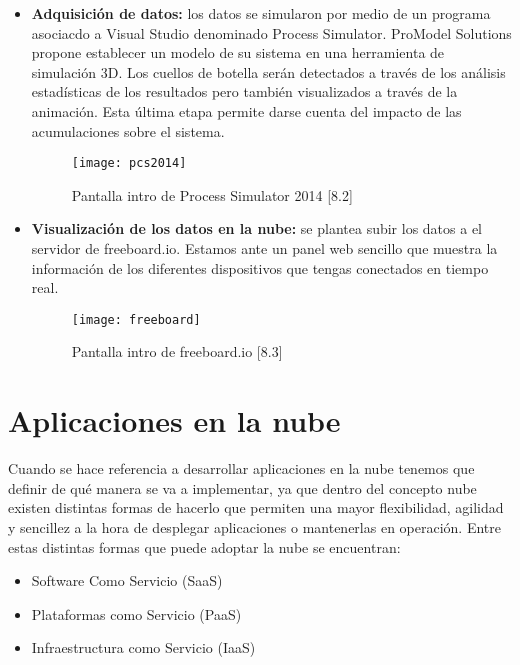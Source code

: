 \documentclass[10pt]{article}   			%
\begin{document}
\begin{itemize}
	\item \textbf{Adquisición de datos:} los datos se simularon por medio de un programa asociacdo a Visual Studio denominado Process Simulator. ProModel Solutions  propone establecer un modelo de su sistema en una herramienta de simulación 3D.
Los cuellos de botella serán detectados a través de los análisis estadísticas de los resultados pero también visualizados a través de la animación. Esta última etapa permite darse cuenta del impacto de las acumulaciones sobre el sistema.

\begin{figure}[ht] 
	\centering
		\texttt{[image: pcs2014]}   
	\caption{Pantalla intro de Process Simulator 2014 [8.2]} \label{fig:pcs2014}
\end{figure}
		
	\item \textbf{Visualización de los datos en la nube:} se plantea subir los datos a el servidor de freeboard.io. Estamos ante un panel web sencillo que muestra la información de los diferentes dispositivos que tengas conectados en tiempo real.

\begin{figure}[ht] 
	\centering
		\texttt{[image: freeboard]}   
	\caption{Pantalla intro de freeboard.io [8.3]} \label{fig:freeboard}
\end{figure}
		
\end{itemize}
		

\newpage 

\section{Aplicaciones en la nube}

Cuando se hace referencia a desarrollar aplicaciones en la nube tenemos que definir de qué manera se va a implementar, ya que dentro del concepto nube existen distintas formas de hacerlo que permiten una mayor flexibilidad, agilidad y sencillez a la hora de desplegar aplicaciones o mantenerlas en operación. Entre estas distintas formas que puede adoptar la nube se encuentran:

\begin{itemize}
	\item Software Como Servicio (SaaS)
	\item Plataformas como Servicio (PaaS)
	\item Infraestructura como Servicio (IaaS)
\end{itemize}
\end{document}
